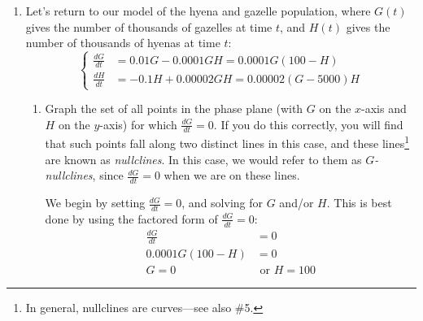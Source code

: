 \documentclass[main]{subfiles}
\begin{document}
\begin{enumerate}
\begin{enumerate}
\begin{solution}
  \end{solution}


\end{enumerate}


  \item 


Let's return to our model of the hyena and gazelle population, where $G(t)$ gives the number of thousands of gazelles at time $t$, and $H(t)$ gives the number of thousands of hyenas at time $t$:
\[ \left\{
\begin{aligned}
\frac{dG}{dt} & = 0.01G - 0.0001 GH = 0.0001G(100- H) \\ 
\frac{dH}{dt} & = -0.1 H + 0.00002 GH = 0.00002(G-5000) H
\end{aligned}
\right.\]

\begin{enumerate}

\item
\begin{problem}[2.5in]
Graph the set of all points in the phase plane (with $G$ on the $x$-axis and $H$ on the $y$-axis) for which
        $\frac{dG}{dt} = 0$.  If you do this correctly, you will find that such points fall along
        two distinct lines in this case, and these lines\footnote{In general, nullclines are curves---see
          also \#5.} are known as {\em nullclines}. In this case, we would refer to them as {\em $G$-nullclines}, since $\frac{dG}{dt} = 0$ when we are on these lines.
\end{problem}

\begin{solution}
We begin by setting $\displaystyle \frac{dG}{dt} = 0$, and solving for $G$ and/or $H$. This is best done by using the factored form of $\displaystyle \frac{dG}{dt} = 0$:
\begin{align*}
\frac{dG}{dt} &= 0\\
0.0001G(100- H) &=0\\
G=0 &\text{ or } H=100
\end{align*}


\end{solution}
\end{enumerate}
\end{enumerate}
\end{document}
